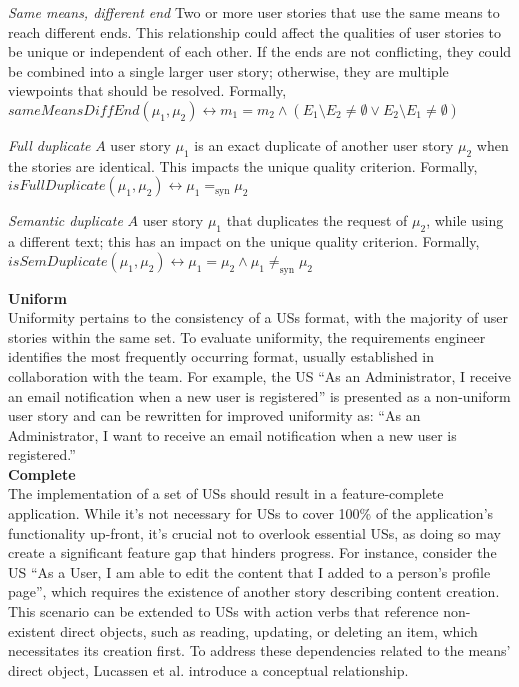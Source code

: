 \begin{definition}
\emph{Same means, different end} Two or more user stories that use the same means to reach different ends. This relationship could affect the qualities of user stories to be unique or independent of each other. If the ends are not conflicting, they could be combined into a single larger user story; otherwise, they are multiple viewpoints that should be resolved. Formally,\\ 
$sameMeansDiffEnd(\mu_1, \mu_2) \leftrightarrow m_1 = m_2 \wedge (E_1 \setminus E_2 \neq \emptyset \vee E_2 \setminus E_1 \neq \emptyset )$
\end{definition}
\begin{definition}
\emph{Full duplicate} $A$ user story $\mu_1$ is an exact duplicate of another user story  $\mu_2$ when the stories are identical. This impacts the unique quality criterion. Formally,\\ 
$isFullDuplicate(\mu_1,\mu_2) \leftrightarrow \mu_1 =_{\text{syn}} \mu_2$
\end{definition}
\begin{definition}
\emph{Semantic duplicate} $A$ user story $\mu_1$ that duplicates the request of $\mu_2$, while using a different text; this has an impact on the unique quality criterion. Formally,\\ 
$isSemDuplicate(\mu_1,\mu_2) \leftrightarrow \mu_1 = \mu_2 \wedge \mu_1 \neq _{\text{syn}} \mu_2$
\end{definition}
\textbf{Uniform}\\ 
Uniformity pertains to the consistency of a USs format, with the majority of user stories within the same set. To evaluate uniformity, the requirements engineer identifies the most frequently occurring format, usually established in collaboration with the team. For example, the US \enquote{As an Administrator, I receive an email notification when a new user is registered} is presented as a non-uniform user story and can be rewritten for improved uniformity as: \enquote{As an Administrator, I want to receive an email notification when a new user is registered.} \\ 
\textbf{Complete}\\ 
The implementation of a set of USs should result in a feature-complete application. While it's not necessary for USs to cover 100\% of the application's functionality up-front, it's crucial not to overlook essential USs, as doing so may create a significant feature gap that hinders progress. For instance, consider the US \enquote{As a User, I am able to edit the content that I added to a person’s profile page}, which requires the existence of another story describing content creation. This scenario can be extended to USs with action verbs that reference non-existent direct objects, such as reading, updating, or deleting an item, which necessitates its creation first. To address these dependencies related to the means' direct object, Lucassen et al. introduce a conceptual relationship. 
 







